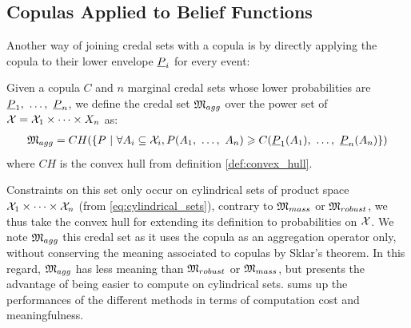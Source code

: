 \subsection{Copulas Applied to Belief Functions}\label{sec:aggregation_method}
Another way of joining credal sets with a copula is by directly applying the copula to their lower envelope $\underline{P}_i$ for every event:
\begin{definition}\label{def:aggregation_credal_set}
    Given a copula $C$ and $n$ marginal credal sets whose lower probabilities are $\underline{P}_1 , ~\dots, ~ \underline{P}_n$, we define the credal set $\mathfrak{M}_{agg}$ over the power set of $\mathcal{X}=\mathcal{X}_1\times\dots\times X_n$ as:
    \begin{eqnarray}
        \mathfrak{M}_{agg} = CH(\{P ~|~\forall A_i\subseteq\mathcal{X}_i, P(A_1 , ~\dots, ~  A_n)\geqslant C(\underline{P}_1(A_1) , ~\dots, ~ \underline{P}_n(A_n)\})\label{eq:copula_on_lower_proba}
    \end{eqnarray}
    where $CH$ is the convex hull from definition \ref{def:convex_hull}.
\end{definition}

Constraints on this set only occur on cylindrical sets of product space $\mathcal{X}_1\times\dots\times \mathcal{X}_n$ (from \cref{eq:cylindrical_sets}), contrary to $\mathfrak{M}_{mass}$ or $\mathfrak{M}_{robust}$, we thus take the convex hull for extending its definition to probabilities on $\mathcal{X}$. We note $\mathfrak{M}_{agg}$ this credal set as it uses the copula as an aggregation operator only, without conserving the meaning associated to copulas by Sklar's theorem. In this regard, $\mathfrak{M}_{agg}$ has less meaning than $\mathfrak{M}_{robust}$ or $\mathfrak{M}_{mass}$, but presents the advantage of being easier to compute on cylindrical sets.  sums up the performances of the different methods in terms of computation cost and meaningfulness.


